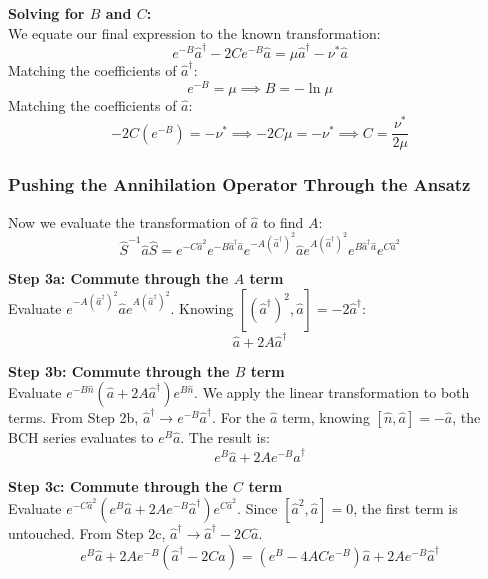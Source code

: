 \textbf{Solving for $B$ and $C$:} \\
We equate our final expression to the known transformation:
\begin{equation*}
e^{-B}\hat{a}^\dagger - 2Ce^{-B}\hat{a} = \mu\hat{a}^\dagger - \nu^*\hat{a}
\end{equation*}
Matching the coefficients of $\hat{a}^\dagger$: 
\begin{equation*}
e^{-B} = \mu \implies B = -\ln\mu
\end{equation*}
Matching the coefficients of $\hat{a}$:
\begin{equation*}
-2C(e^{-B}) = -\nu^* \implies -2C\mu = -\nu^* \implies C = \frac{\nu^*}{2\mu}
\end{equation*}

\subsubsection{Pushing the Annihilation Operator Through the Ansatz}
Now we evaluate the transformation of $\hat{a}$ to find $A$:
\begin{equation*}
\hat{S}^{-1} \hat{a} \hat{S} = e^{-C\hat{a}^2} e^{-B\hat{a}^\dagger\hat{a}} e^{-A(\hat{a}^\dagger)^2} \hat{a} e^{A(\hat{a}^\dagger)^2} e^{B\hat{a}^\dagger\hat{a}} e^{C\hat{a}^2}
\end{equation*}

\textbf{Step 3a: Commute through the $A$ term} \\
Evaluate $e^{-A(\hat{a}^\dagger)^2} \hat{a} e^{A(\hat{a}^\dagger)^2}$. Knowing $[(\hat{a}^\dagger)^2, \hat{a}] = -2\hat{a}^\dagger$:
\begin{equation*}
\hat{a} + 2A\hat{a}^\dagger
\end{equation*}

\textbf{Step 3b: Commute through the $B$ term} \\
Evaluate $e^{-B\hat{n}} (\hat{a} + 2A\hat{a}^\dagger) e^{B\hat{n}}$. We apply the linear transformation to both terms. From Step 2b, $\hat{a}^\dagger \rightarrow e^{-B}\hat{a}^\dagger$. For the $\hat{a}$ term, knowing $[\hat{n}, \hat{a}] = -\hat{a}$, the BCH series evaluates to $e^B\hat{a}$. The result is:
\begin{equation*}
e^B\hat{a} + 2Ae^{-B}\hat{a}^\dagger
\end{equation*}

\textbf{Step 3c: Commute through the $C$ term} \\
Evaluate $e^{-C\hat{a}^2} (e^B\hat{a} + 2Ae^{-B}\hat{a}^\dagger) e^{C\hat{a}^2}$. Since $[\hat{a}^2, \hat{a}] = 0$, the first term is untouched. From Step 2c, $\hat{a}^\dagger \rightarrow \hat{a}^\dagger - 2C\hat{a}$.
\begin{equation*}
e^B\hat{a} + 2Ae^{-B}(\hat{a}^\dagger - 2C\hat{a}) = (e^B - 4ACe^{-B})\hat{a} + 2Ae^{-B}\hat{a}^\dagger
\end{equation*}

